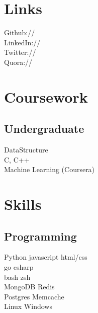 \documentclass[]{deedy-resume-openfont}
\begin{document}
\begin{minipage}[t]{0.33\textwidth}
\section{Links}
Github:// \href{https://github.com/arindampradhan}{} \\
LinkedIn://  \href{https://in.linkedin.com/in/arindampradhan}{} \\
Twitter://  \href{https://twitter.com/rrindam}{} \\
Quora://  \href{https://www.quora.com/profile/Arindam-Pradhan}{}
\sectionsep


\section{Coursework}

\subsection{Undergraduate}
DataStructure \\
C, C++ \\
Machine Learning (Coursera) \\
\sectionsep


\section{Skills}
\subsection{Programming}
\textbullet{} Python \textbullet{} javascript \break \textbullet{} html/css \\
\textbullet{} go \textbullet{} csharp \\
\textbullet{} bash \textbullet{} zsh \\
\textbullet{} MongoDB \textbullet{} Redis \\
\textbullet{} Postgres \textbullet{} Memcache \\
Linux \textbullet{} Windows \\
\sectionsep


\end{minipage}
\end{document}
